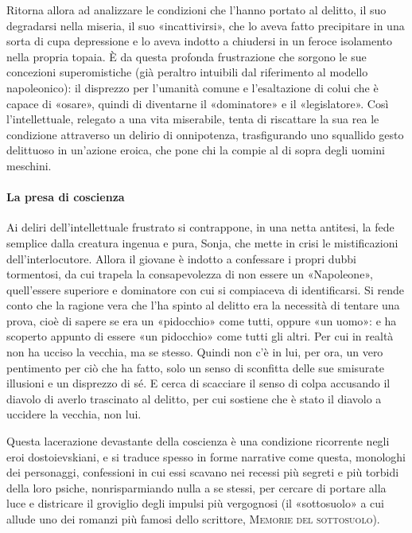 \documentclass{book}
\begin{document}
Ritorna allora ad analizzare le condizioni che l'hanno portato al delitto, il suo degradarsi nella miseria, il suo «incattivirsi», che lo aveva fatto precipitare in una sorta di cupa depressione e lo aveva indotto a chiudersi in un feroce isolamento nella propria topaia. È da questa profonda frustrazione che sorgono le sue concezioni superomistiche (già peraltro intuibili dal riferimento al modello napoleonico): il disprezzo per l'umanità comune e l'esaltazione di colui che è capace di «osare», quindi di diventarne il «dominatore» e il «legislatore». Così l'intellettuale, relegato a una vita miserabile, tenta di riscattare la sua rea le condizione attraverso un delirio di onnipotenza, trasfigurando uno squallido gesto delittuoso in un'azione eroica, che pone chi la compie al di sopra degli uomini meschini.

\paragraph{La presa di coscienza} Ai deliri dell'intellettuale frustrato si contrappone, in una netta antitesi, la fede semplice dalla creatura ingenua e pura, Sonja, che mette in crisi le mistificazioni dell'interlocutore. Allora il giovane è indotto a confessare i propri dubbi tormentosi, da cui trapela la consapevolezza di non essere un «Napoleone», quell'essere superiore e dominatore con cui si compiaceva di identificarsi. Si rende conto che la ragione vera che l'ha spinto al delitto era la necessità di tentare una prova, cioè di sapere se era un «pidocchio» come tutti, oppure «un uomo»: e ha scoperto appunto di essere «un pidocchio» come tutti gli altri. Per cui in realtà non ha ucciso la vecchia, ma se stesso. Quindi non c'è in lui, per ora, un vero pentimento per ciò che ha fatto, solo un senso di sconfitta delle sue smisurate illusioni e un disprezzo di sé. E cerca di scacciare il senso di colpa accusando il diavolo di averlo trascinato al delitto, per cui sostiene che è stato il diavolo a uccidere la vecchia, non lui. 

Questa lacerazione devastante della coscienza è una condizione ricorrente negli eroi dostoievskiani, e si traduce spesso in forme narrative come questa, monologhi dei personaggi, confessioni in cui essi scavano nei recessi più segreti e più torbidi della loro psiche, nonrisparmiando nulla a se stessi, per cercare di portare alla luce e districare il groviglio degli impulsi più vergognosi (il «sottosuolo» a cui allude uno dei romanzi più famosi dello scrittore, \textsc{Memorie del sottosuolo}).
\end{document}
